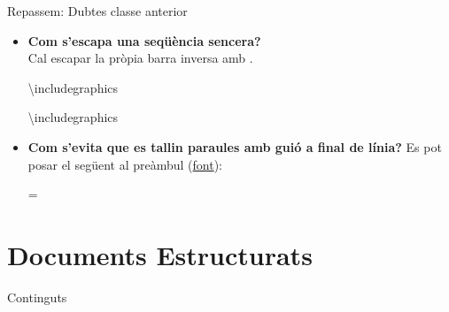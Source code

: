 \begin{frame}[fragile]{Repassem: Dubtes classe anterior}
\begin{itemize}
    \item \textbf{Com s'escapa una seqüència sencera?}\\
    Cal escapar la pròpia barra inversa \keystroke{\textbackslash} amb .

\begin{exampletwouptiny}
\textbackslash includegraphics

\textbackslash{}includegraphics
\end{exampletwouptiny}
\item \textbf{Com s'evita que es tallin paraules amb guió a final de línia?}
Es pot posar el següent al preàmbul (\href{https://tex.stackexchange.com/questions/5036/how-to-prevent-latex-from-hyphenating-the-entire-document}{font}):

\begin{exampletiny}
\emergencystretch=\maxdimen
{}
\end{exampletiny}
\end{itemize}
\end{frame}


\section{Documents Estructurats}
\begin{frame}{Continguts}
\begin{multicols}{2}
\tableofcontents[currentsection]
\end{multicols}
\end{frame}

